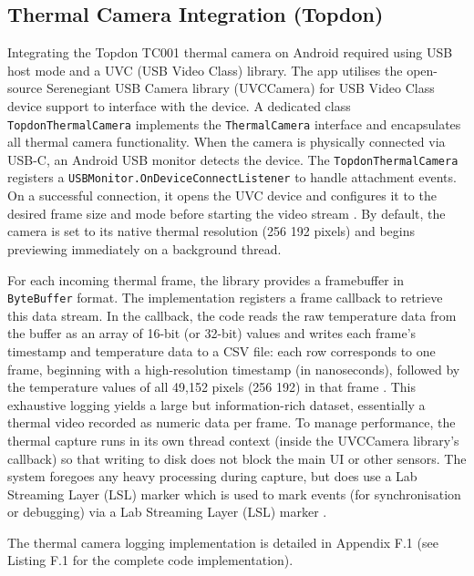 \subsection{Thermal Camera Integration (Topdon)}\label{sec:4-2-1}
Integrating the Topdon TC001 thermal camera on Android required using USB host mode and a UVC (USB Video Class) library. The app utilises the open-source Serenegiant USB Camera library (UVCCamera) for USB Video Class device support \cite{ref16} to interface with the device. A dedicated class \texttt{TopdonThermalCamera} implements the \texttt{ThermalCamera} interface and encapsulates all thermal camera functionality. When the camera is physically connected via USB-C, an Android USB monitor detects the device. The \texttt{TopdonThermalCamera} registers a \texttt{USBMonitor.OnDeviceConnectListener} to handle attachment events. On a successful connection, it opens the UVC device and configures it to the desired frame size and mode before starting the video stream \cite{ref16}. By default, the camera is set to its native thermal resolution (256\,\texttimes\,192 pixels) and begins previewing immediately on a background thread.

For each incoming thermal frame, the library provides a framebuffer in \texttt{ByteBuffer} format. The implementation registers a frame callback to retrieve this data stream. In the callback, the code reads the raw temperature data from the buffer as an array of 16-bit (or 32-bit) values and writes each frame's timestamp and temperature data to a CSV file: each row corresponds to one frame, beginning with a high-resolution timestamp (in nanoseconds), followed by the temperature values of all 49{,}152 pixels (256\,\texttimes\,192) in that frame \cite{ref16}. This exhaustive logging yields a large but information-rich dataset, essentially a thermal video recorded as numeric data per frame. To manage performance, the thermal capture runs in its own thread context (inside the UVCCamera library's callback) so that writing to disk does not block the main UI or other sensors. The system foregoes any heavy processing during capture, but does use a Lab Streaming Layer (LSL) marker which is used to mark events (for synchronisation or debugging) via a Lab Streaming Layer (LSL) marker \cite{ref9}.

The thermal camera logging implementation is detailed in Appendix F.1 (see Listing F.1 for the complete code implementation).

